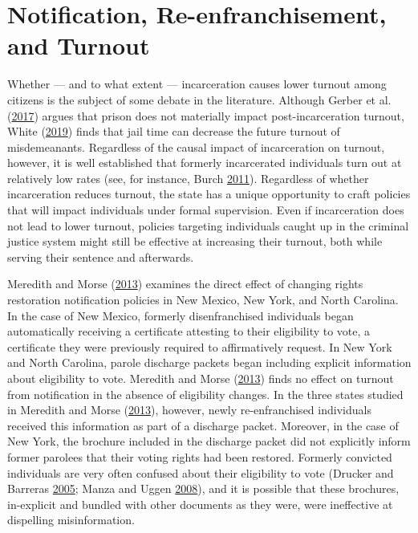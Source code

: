 \documentclass[
  12pt,
]{article}
\begin{document}
\hypertarget{notification-re-enfranchisement-and-turnout}{%
\section*{Notification, Re-enfranchisement, and Turnout}\label{notification-re-enfranchisement-and-turnout}}

Whether --- and to what extent --- incarceration causes lower turnout among citizens is the subject of some debate in the literature. Although Gerber et al. (\protect\hyperlink{ref-Gerber2017}{2017}) argues that prison does not materially impact post-incarceration turnout, White (\protect\hyperlink{ref-White2019}{2019}) finds that jail time can decrease the future turnout of misdemeanants. Regardless of the causal impact of incarceration on turnout, however, it is well established that formerly incarcerated individuals turn out at relatively low rates (see, for instance, Burch \protect\hyperlink{ref-Burch2011}{2011}). Regardless of whether incarceration reduces turnout, the state has a unique opportunity to craft policies that will impact individuals under formal supervision. Even if incarceration does not lead to lower turnout, policies targeting individuals caught up in the criminal justice system might still be effective at increasing their turnout, both while serving their sentence and afterwards.

Meredith and Morse (\protect\hyperlink{ref-Meredith2013}{2013}) examines the direct effect of changing rights restoration notification policies in New Mexico, New York, and North Carolina. In the case of New Mexico, formerly disenfranchised individuals began automatically receiving a certificate attesting to their eligibility to vote, a certificate they were previously required to affirmatively request. In New York and North Carolina, parole discharge packets began including explicit information about eligibility to vote. Meredith and Morse (\protect\hyperlink{ref-Meredith2013}{2013}) finds no effect on turnout from notification in the absence of eligibility changes. In the three states studied in Meredith and Morse (\protect\hyperlink{ref-Meredith2013}{2013}), however, newly re-enfranchised individuals received this information as part of a discharge packet. Moreover, in the case of New York, the brochure included in the discharge packet did not explicitly inform former parolees that their voting rights had been restored. Formerly convicted individuals are very often confused about their eligibility to vote (Drucker and Barreras \protect\hyperlink{ref-Drucker2005}{2005}; Manza and Uggen \protect\hyperlink{ref-locked_out}{2008}), and it is possible that these brochures, in-explicit and bundled with other documents as they were, were ineffective at dispelling misinformation.
\end{document}
